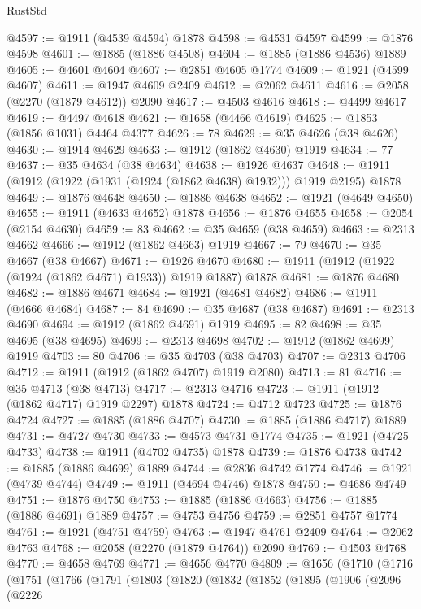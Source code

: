 \begin{lexlean}{RustStd}
\begin{coremodule}
@4597 := @1911 (@4539 @4594) @1878
@4598 := @4531 @4597
@4599 := @1876 @4598
@4601 := @1885 (@1886 @4508)
@4604 := @1885 (@1886 @4536) @1889
@4605 := @4601 @4604
@4607 := @2851 @4605 @1774
@4609 := @1921 (@4599 @4607)
@4611 := @1947 @4609 @2409
@4612 := @2062 @4611
@4616 := @2058 (@2270 (@1879 @4612)) @2090
@4617 := @4503 @4616
@4618 := @4499 @4617
@4619 := @4497 @4618
@4621 := @1658 (@4466 @4619)
@4625 := @1853 (@1856 @1031) @4464 @4377
@4626 := 78
@4629 := @35 @4626 (@38 @4626)
@4630 := @1914 @4629
@4633 := @1912 (@1862 @4630) @1919
@4634 := 77
@4637 := @35 @4634 (@38 @4634)
@4638 := @1926 @4637
@4648 := @1911 (@1912 (@1922 (@1931 (@1924 (@1862 @4638) @1932))) @1919 @2195) @1878
@4649 := @1876 @4648
@4650 := @1886 @4638
@4652 := @1921 (@4649 @4650)
@4655 := @1911 (@4633 @4652) @1878
@4656 := @1876 @4655
@4658 := @2054 (@2154 @4630)
@4659 := 83
@4662 := @35 @4659 (@38 @4659)
@4663 := @2313 @4662
@4666 := @1912 (@1862 @4663) @1919
@4667 := 79
@4670 := @35 @4667 (@38 @4667)
@4671 := @1926 @4670
@4680 := @1911 (@1912 (@1922 (@1924 (@1862 @4671) @1933)) @1919 @1887) @1878
@4681 := @1876 @4680
@4682 := @1886 @4671
@4684 := @1921 (@4681 @4682)
@4686 := @1911 (@4666 @4684)
@4687 := 84
@4690 := @35 @4687 (@38 @4687)
@4691 := @2313 @4690
@4694 := @1912 (@1862 @4691) @1919
@4695 := 82
@4698 := @35 @4695 (@38 @4695)
@4699 := @2313 @4698
@4702 := @1912 (@1862 @4699) @1919
@4703 := 80
@4706 := @35 @4703 (@38 @4703)
@4707 := @2313 @4706
@4712 := @1911 (@1912 (@1862 @4707) @1919 @2080)
@4713 := 81
@4716 := @35 @4713 (@38 @4713)
@4717 := @2313 @4716
@4723 := @1911 (@1912 (@1862 @4717) @1919 @2297) @1878
@4724 := @4712 @4723
@4725 := @1876 @4724
@4727 := @1885 (@1886 @4707)
@4730 := @1885 (@1886 @4717) @1889
@4731 := @4727 @4730
@4733 := @4573 @4731 @1774
@4735 := @1921 (@4725 @4733)
@4738 := @1911 (@4702 @4735) @1878
@4739 := @1876 @4738
@4742 := @1885 (@1886 @4699) @1889
@4744 := @2836 @4742 @1774
@4746 := @1921 (@4739 @4744)
@4749 := @1911 (@4694 @4746) @1878
@4750 := @4686 @4749
@4751 := @1876 @4750
@4753 := @1885 (@1886 @4663)
@4756 := @1885 (@1886 @4691) @1889
@4757 := @4753 @4756
@4759 := @2851 @4757 @1774
@4761 := @1921 (@4751 @4759)
@4763 := @1947 @4761 @2409
@4764 := @2062 @4763
@4768 := @2058 (@2270 (@1879 @4764)) @2090
@4769 := @4503 @4768
@4770 := @4658 @4769
@4771 := @4656 @4770
@4809 := @1656
    (@1710
      (@1716
        (@1751
          (@1766
            (@1791
              (@1803
                (@1820
                  (@1832
                    (@1852
                      (@1895
                        (@1906
                          (@2096
                            (@2226

\end{coremodule}
\end{lexlean}
